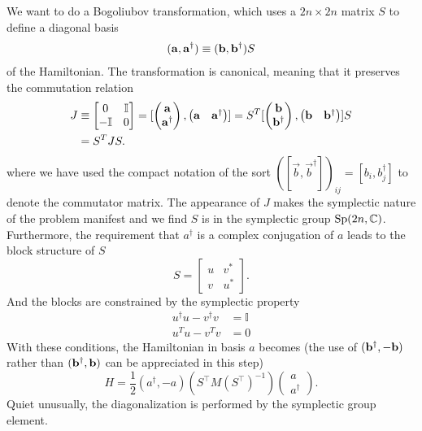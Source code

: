We want to do a Bogoliubov transformation, which uses a $2n \times 2n$ matrix $S$ to define a diagonal basis 
\begin{equation}\begin{aligned}
\label{eq:def_a}
({\bf a} , {\bf a}^\dagger)\equiv({\bf b} , {\bf b}^\dagger)S
\end{aligned}\end{equation}
of the Hamiltonian. The transformation is canonical, meaning that it preserves the commutation relation 
\begin{equation}
\begin{aligned}
\label{eq:preserve_commutator}
J&\equiv\begin{bmatrix}
0 & \mathbb{I}\\
-\mathbb{I} & 0
\end{bmatrix}
=[
\begin{pmatrix}
{\bf a} \\
{\bf a}^\dagger
\end{pmatrix},
\begin{pmatrix}
{\bf a} & {\bf a}^\dagger
\end{pmatrix}]
=S^T[
\begin{pmatrix}
{\bf b} \\
{\bf b}^\dagger
\end{pmatrix},
\begin{pmatrix}
{\bf b} & {\bf b}^\dagger
\end{pmatrix}]S \\
&=S^T JS.
\end{aligned}
\end{equation}
where we have used the compact notation of the sort $([\vec{b}, \vec{b}^{\dagger}])_{ij} =  [b_i, b_j^\dagger]$ to denote the commutator matrix. The appearance of $J$ makes the symplectic nature of the problem manifest and we find $S$ is in the symplectic group ${\rm Sp}( 2n, \mathbb{C} ) $\cite{blaizot_quantum_1986,fulton_representation_2004}. Furthermore, the requirement that $a^\dagger$ is a complex conjugation of $a$ leads to the block structure of $S$
\begin{equation}
\label{eq:block_S}
S=
\begin{bmatrix}
u & v^*\\
v & u^*
\end{bmatrix}.
\end{equation}
And the blocks are constrained by the symplectic property
\begin{eqnarray}
  u^\dagger u-v^\dagger v&=\mathbb{I}\label{eq:constraint_1}\\
  u^T u-v^T v&=0\label{eq:constraint_2}  
\end{eqnarray}
With these conditions, the Hamiltonian in basis $a$ becomes (the use of $({\bf b}^\dagger , -{\bf b})$ rather than $({\bf b}^\dagger , {\bf b})$ can be appreciated in this step)
\begin{equation}
H = \frac{1}{2} ( a^{\dagger}, -a )  (S^{\top} M (S^{\top})^{-1} )
\begin{pmatrix}
a\\
a^{\dagger} 
\end{pmatrix}.
\end{equation}
Quiet unusually, the diagonalization is performed by the symplectic group element.

